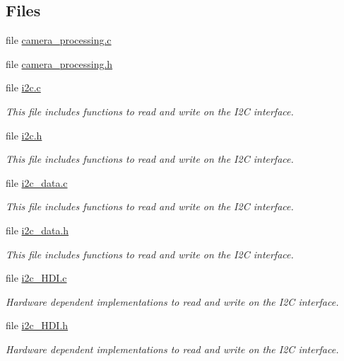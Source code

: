 \subsection*{Files}
\begin{DoxyCompactItemize}
\item 
file \hyperlink{camera__processing_8c}{camera\+\_\+processing.\+c}
\item 
file \hyperlink{camera__processing_8h}{camera\+\_\+processing.\+h}
\item 
file \hyperlink{i2c_8c}{i2c.\+c}
\begin{DoxyCompactList}\small\item\em This file includes functions to read and write on the I2\+C interface. \end{DoxyCompactList}\item 
file \hyperlink{i2c_8h}{i2c.\+h}
\begin{DoxyCompactList}\small\item\em This file includes functions to read and write on the I2\+C interface. \end{DoxyCompactList}\item 
file \hyperlink{i2c__data_8c}{i2c\+\_\+data.\+c}
\begin{DoxyCompactList}\small\item\em This file includes functions to read and write on the I2\+C interface. \end{DoxyCompactList}\item 
file \hyperlink{i2c__data_8h}{i2c\+\_\+data.\+h}
\begin{DoxyCompactList}\small\item\em This file includes functions to read and write on the I2\+C interface. \end{DoxyCompactList}\item 
file \hyperlink{i2c__HDI_8c}{i2c\+\_\+\+H\+D\+I.\+c}
\begin{DoxyCompactList}\small\item\em Hardware dependent implementations to read and write on the I2\+C interface. \end{DoxyCompactList}\item 
file \hyperlink{i2c__HDI_8h}{i2c\+\_\+\+H\+D\+I.\+h}
\begin{DoxyCompactList}\small\item\em Hardware dependent implementations to read and write on the I2\+C interface. \end{DoxyCompactList}\end{DoxyCompactItemize}


